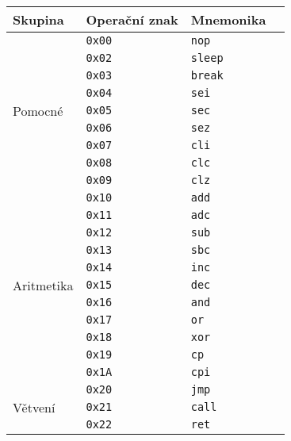 \begin{table}[htbp]
\begin{center}
\begin{tabular}{| l | l | l | l |}
\hline
\textbf{Skupina} & \textbf{Operační znak} & \textbf{Mnemonika} \\
\hline
\multirow{9}{*}{Pomocné} & \texttt{0x00} & \texttt{nop} \\
                         & \texttt{0x02} & \texttt{sleep} \\
                         & \texttt{0x03} & \texttt{break} \\
                         & \texttt{0x04} & \texttt{sei} \\
                         & \texttt{0x05} & \texttt{sec} \\
                         & \texttt{0x06} & \texttt{sez} \\
                         & \texttt{0x07} & \texttt{cli} \\
                         & \texttt{0x08} & \texttt{clc} \\
                         & \texttt{0x09} & \texttt{clz} \\
\hline
\multirow{11}{*}{Aritmetika} & \texttt{0x10} & \texttt{add} \\
                             & \texttt{0x11} & \texttt{adc} \\
                             & \texttt{0x12} & \texttt{sub} \\
                             & \texttt{0x13} & \texttt{sbc} \\
                             & \texttt{0x14} & \texttt{inc} \\
                             & \texttt{0x15} & \texttt{dec} \\
                             & \texttt{0x16} & \texttt{and} \\
                             & \texttt{0x17} & \texttt{or} \\
                             & \texttt{0x18} & \texttt{xor} \\
                             & \texttt{0x19} & \texttt{cp} \\
                             & \texttt{0x1A} & \texttt{cpi} \\
\hline
\multirow{8}{*}{Větvení} & \texttt{0x20} & \texttt{jmp} \\
                         & \texttt{0x21} & \texttt{call} \\
                         & \texttt{0x22} & \texttt{ret} \\

\end{tabular}
\end{center}
\end{table}
